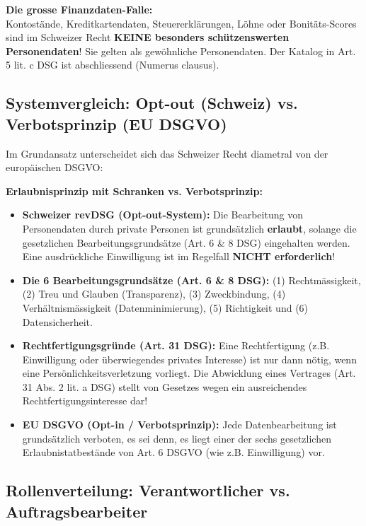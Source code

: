 \begin{remark}
    \textbf{Die grosse Finanzdaten-Falle:} \\
    Kontostände, Kreditkartendaten, Steuererklärungen, Löhne oder Bonitäts-Scores sind im Schweizer Recht \textbf{KEINE besonders schützenswerten Personendaten}! Sie gelten als gewöhnliche Personendaten. Der Katalog in Art. 5 lit. c DSG ist abschliessend (Numerus clausus).
\end{remark}

\subsection{Systemvergleich: Opt-out (Schweiz) vs. Verbotsprinzip (EU DSGVO)}

Im Grundansatz unterscheidet sich das Schweizer Recht diametral von der europäischen DSGVO:

\begin{theorem}
    \textbf{Erlaubnisprinzip mit Schranken vs. Verbotsprinzip:}
    \begin{itemize}
        \item \textbf{Schweizer revDSG (Opt-out-System):} Die Bearbeitung von Personendaten durch private Personen ist grundsätzlich \textbf{erlaubt}, solange die gesetzlichen Bearbeitungsgrundsätze (Art. 6 \& 8 DSG) eingehalten werden. Eine ausdrückliche Einwilligung ist im Regelfall \textbf{NICHT erforderlich}!
        \item \textbf{Die 6 Bearbeitungsgrundsätze (Art. 6 \& 8 DSG):} (1) Rechtmässigkeit, (2) Treu und Glauben (Transparenz), (3) Zweckbindung, (4) Verhältnismässigkeit (Datenminimierung), (5) Richtigkeit und (6) Datensicherheit.
        \item \textbf{Rechtfertigungsgründe (Art. 31 DSG):} Eine Rechtfertigung (z.B. Einwilligung oder überwiegendes privates Interesse) ist nur dann nötig, wenn eine Persönlichkeitsverletzung vorliegt. Die Abwicklung eines Vertrages (Art. 31 Abs. 2 lit. a DSG) stellt von Gesetzes wegen ein ausreichendes Rechtfertigungsinteresse dar!
        \item \textbf{EU DSGVO (Opt-in / Verbotsprinzip):} Jede Datenbearbeitung ist grundsätzlich verboten, es sei denn, es liegt einer der sechs gesetzlichen Erlaubnistatbestände von Art. 6 DSGVO (wie z.B. Einwilligung) vor.
    \end{itemize}
\end{theorem}

\subsection{Rollenverteilung: Verantwortlicher vs. Auftragsbearbeiter}

